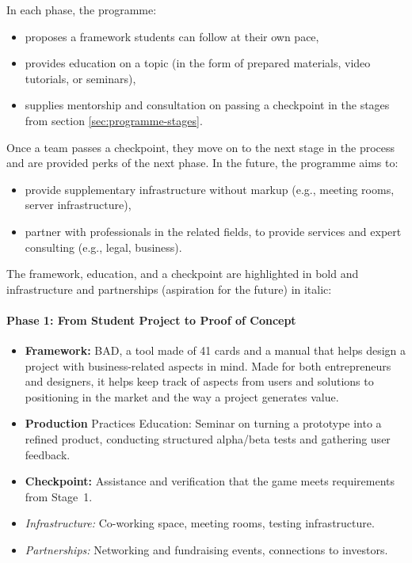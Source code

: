 In each phase, the programme:
\begin{itemize}
    \item proposes a framework students can follow at their own pace,
    \item provides education on a topic (in the form of prepared materials, video tutorials, or seminars),
    \item supplies mentorship and consultation on passing a checkpoint in the stages from section \ref{sec:programme-stages}.
\end{itemize}
Once a team passes a checkpoint, they move on to the next stage in the process and are provided perks of the next phase. In the future, the programme aims to:
\begin{itemize}
    \item provide supplementary infrastructure without markup (e.g., meeting rooms, server infrastructure),
    \item partner with professionals in the related fields, to provide services and expert consulting (e.g., legal, business).
\end{itemize}

The framework, education, and a checkpoint are highlighted in bold and infrastructure and partnerships (aspiration for the future) in italic:
\paragraph{\large Phase 1: From Student Project to Proof of Concept}
\begin{itemize}
    \item \textbf{Framework:} BAD, a tool made of 41 cards and a manual that helps design a project with business-related aspects in mind. Made for both entrepreneurs and designers, it helps keep track of aspects from users and solutions to positioning in the market and the way a project generates value.
    \item \textbf{Production }Practices Education: Seminar on turning a prototype into a refined product, conducting structured alpha/beta tests and gathering user feedback.
    \item \textbf{Checkpoint:} Assistance and verification that the game meets requirements from Stage~1.
    \item \textit{Infrastructure:} Co-working space, meeting rooms, testing infrastructure.
    \item \textit{Partnerships:} Networking and fundraising events, connections to investors.
\end{itemize}

